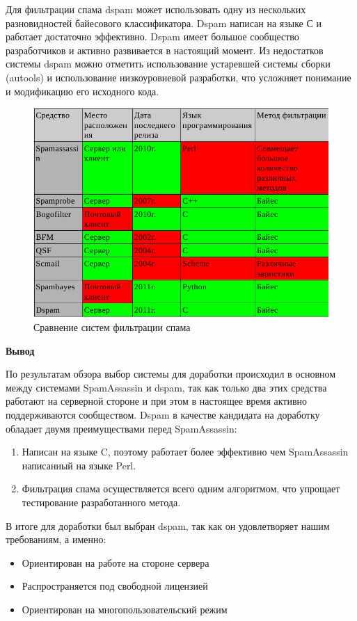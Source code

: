 Для фильтрации спама dspam может использовать одну из нескольких разновидностей байесового классификатора.
Dspam написан на языке С и работает достаточно эффективно. Dspam имеет большое сообщество разработчиков и активно развивается в настоящий момент.
Из недостатков системы dspam можно отметить использование устаревшей системы сборки (autools) и использование низкоуровневой разработки, что усложняет понимание и модификацию его исходного кода.
\begin{figure}[h]
\begin{center}
\includegraphics[width=13cm]{img/compare}
\end{center}
\caption{Сравнение систем фильтрации спама}
\label{spam_systems}
\end{figure}

\textbf {Вывод}

По результатам обзора выбор системы для доработки происходил в основном между системами SpamAssassin и dspam, так как только два этих средства работают на серверной стороне и при этом в настоящее время активно поддерживаются сообществом. Dspam в качестве кандидата на доработку обладает двумя преимуществами перед SpamAssassin:
\begin{enumerate}
\item Написан на языке C, поэтому работает более эффективно чем SpamAssassin написанный на языке Perl.
\item Фильтрация спама осуществляется  всего одним алгоритмом, что упрощает тестирование разработанного метода.
\end{enumerate}

В итоге для доработки  был выбран dspam, так как он удовлетворяет нашим требованиям, а именно:
\begin{itemize}
\item Ориентирован на работе на стороне сервера
\item Распространяется под свободной лицензией
\item Ориентирован на многопользовательский режим
\end{itemize}

